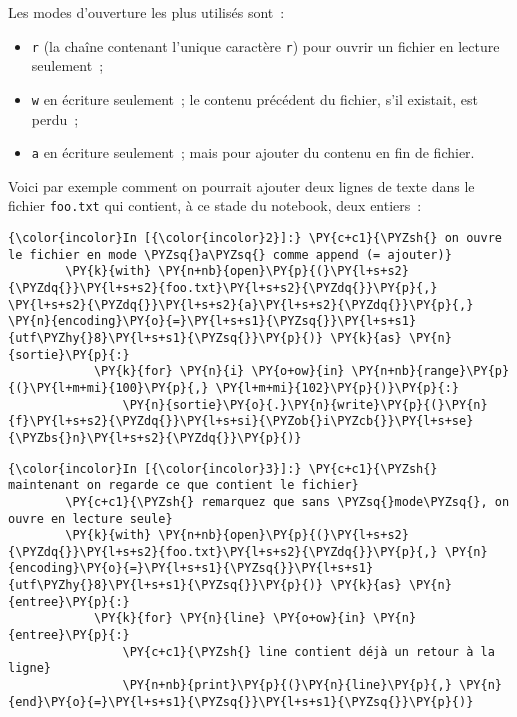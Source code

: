     Les modes d'ouverture les plus utilisés sont~:

\begin{itemize}
\tightlist
\item
  \texttt{\textquotesingle{}r\textquotesingle{}} (la chaîne contenant
  l'unique caractère \texttt{r}) pour ouvrir un fichier en lecture
  seulement~;
\item
  \texttt{\textquotesingle{}w\textquotesingle{}} en écriture seulement~;
  le contenu précédent du fichier, s'il existait, est perdu~;
\item
  \texttt{\textquotesingle{}a\textquotesingle{}} en écriture seulement~;
  mais pour ajouter du contenu en fin de fichier.
\end{itemize}

    Voici par exemple comment on pourrait ajouter deux lignes de texte dans
le fichier \texttt{foo.txt} qui contient, à ce stade du notebook, deux
entiers~:

    \begin{Verbatim}[commandchars=\\\{\},frame=single,framerule=0.3mm,rulecolor=\color{cellframecolor}]
{\color{incolor}In [{\color{incolor}2}]:} \PY{c+c1}{\PYZsh{} on ouvre le fichier en mode \PYZsq{}a\PYZsq{} comme append (= ajouter)}
        \PY{k}{with} \PY{n+nb}{open}\PY{p}{(}\PY{l+s+s2}{\PYZdq{}}\PY{l+s+s2}{foo.txt}\PY{l+s+s2}{\PYZdq{}}\PY{p}{,} \PY{l+s+s2}{\PYZdq{}}\PY{l+s+s2}{a}\PY{l+s+s2}{\PYZdq{}}\PY{p}{,} \PY{n}{encoding}\PY{o}{=}\PY{l+s+s1}{\PYZsq{}}\PY{l+s+s1}{utf\PYZhy{}8}\PY{l+s+s1}{\PYZsq{}}\PY{p}{)} \PY{k}{as} \PY{n}{sortie}\PY{p}{:}
            \PY{k}{for} \PY{n}{i} \PY{o+ow}{in} \PY{n+nb}{range}\PY{p}{(}\PY{l+m+mi}{100}\PY{p}{,} \PY{l+m+mi}{102}\PY{p}{)}\PY{p}{:}
                \PY{n}{sortie}\PY{o}{.}\PY{n}{write}\PY{p}{(}\PY{n}{f}\PY{l+s+s2}{\PYZdq{}}\PY{l+s+si}{\PYZob{}i\PYZcb{}}\PY{l+s+se}{\PYZbs{}n}\PY{l+s+s2}{\PYZdq{}}\PY{p}{)}
\end{Verbatim}


    \begin{Verbatim}[commandchars=\\\{\},frame=single,framerule=0.3mm,rulecolor=\color{cellframecolor}]
{\color{incolor}In [{\color{incolor}3}]:} \PY{c+c1}{\PYZsh{} maintenant on regarde ce que contient le fichier}
        \PY{c+c1}{\PYZsh{} remarquez que sans \PYZsq{}mode\PYZsq{}, on ouvre en lecture seule}
        \PY{k}{with} \PY{n+nb}{open}\PY{p}{(}\PY{l+s+s2}{\PYZdq{}}\PY{l+s+s2}{foo.txt}\PY{l+s+s2}{\PYZdq{}}\PY{p}{,} \PY{n}{encoding}\PY{o}{=}\PY{l+s+s1}{\PYZsq{}}\PY{l+s+s1}{utf\PYZhy{}8}\PY{l+s+s1}{\PYZsq{}}\PY{p}{)} \PY{k}{as} \PY{n}{entree}\PY{p}{:} 
            \PY{k}{for} \PY{n}{line} \PY{o+ow}{in} \PY{n}{entree}\PY{p}{:}
                \PY{c+c1}{\PYZsh{} line contient déjà un retour à la ligne}
                \PY{n+nb}{print}\PY{p}{(}\PY{n}{line}\PY{p}{,} \PY{n}{end}\PY{o}{=}\PY{l+s+s1}{\PYZsq{}}\PY{l+s+s1}{\PYZsq{}}\PY{p}{)}
\end{Verbatim}


